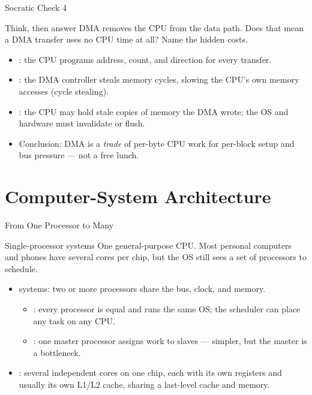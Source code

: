 \documentclass[aspectratio=169]{beamer}
\begin{document}
\begin{frame}{Socratic Check 4}
  \begin{block}{Think, then answer}
    DMA removes the CPU from the data path. Does that mean a DMA transfer uses
    no CPU time at all? Name the hidden costs.
  \end{block}
  \vspace{0.2cm}
  \begin{itemize}
    \item {}: the CPU programs address, count, and direction for every
      transfer.
    \item {}: the DMA controller steals memory cycles, slowing
      the CPU's own memory accesses (cycle stealing).
    \item {}: the CPU may hold stale copies of memory the DMA
      wrote; the OS and hardware must invalidate or flush.
    \item Conclusion: DMA is a \emph{trade} of per-byte CPU work for per-block
      setup and bus pressure --- not a free lunch.
  \end{itemize}
\end{frame}


\section{Computer-System Architecture}

\begin{frame}{From One Processor to Many}
  \begin{block}{Single-processor systems}
    One general-purpose CPU. Most personal computers and phones have several
    cores per chip, but the OS still sees a set of processors to schedule.
  \end{block}
  \begin{itemize}
    \item {} systems: two or more processors share the bus,
      clock, and memory.
      \begin{itemize}
        \item {}: every processor is equal
          and runs the same OS; the scheduler can place any task on any CPU.
        \item {}: one master processor assigns work to slaves ---
          simpler, but the master is a bottleneck.
      \end{itemize}
    \item {}: several independent cores on one chip, each with its
      own registers and usually its own L1/L2 cache, sharing a last-level cache
      and memory.
  \end{itemize}
\end{frame}
\end{document}
